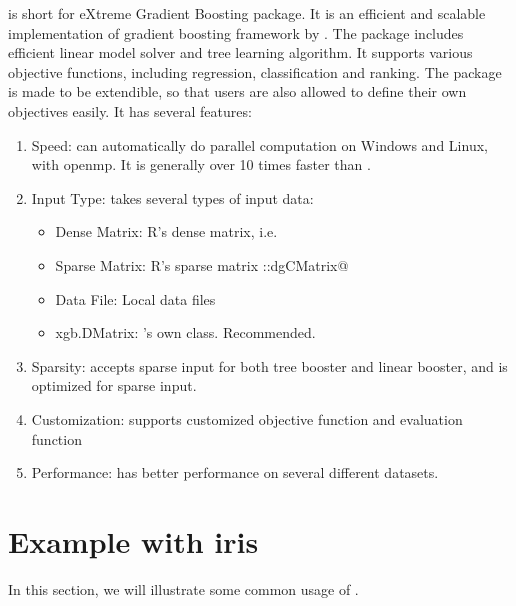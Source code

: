 \documentclass{article}\usepackage[]{graphicx}\usepackage[]{color}
\begin{document}
\verb@xgboost@ is short for eXtreme Gradient Boosting package. It is an efficient
 and scalable implementation of gradient boosting framework by \citep{friedman2001greedy}. 
The package includes efficient linear model solver and tree learning algorithm.
It supports various objective functions, including regression, classification
and ranking. The package is made to be extendible, so that users are also allowed to define their own objectives easily. It has several features:
\begin{enumerate}
    \item{Speed: }{\verb@xgboost@ can automatically do parallel computation on 
    Windows and Linux, with openmp. It is generally over 10 times faster than
    \verb@gbm@.}
    \item{Input Type: }{\verb@xgboost@ takes several types of input data:}
    \begin{itemize}
        \item{Dense Matrix: }{R's dense matrix, i.e. \verb@matrix@}
        \item{Sparse Matrix: }{R's sparse matrix \verb@Matrix::dgCMatrix@}
        \item{Data File: }{Local data files}
        \item{xgb.DMatrix: }{\verb@xgboost@'s own class. Recommended.}
    \end{itemize}
    \item{Sparsity: }{\verb@xgboost@ accepts sparse input for both tree booster 
    and linear booster, and is optimized for sparse input.}
    \item{Customization: }{\verb@xgboost@ supports customized objective function 
    and evaluation function}
    \item{Performance: }{\verb@xgboost@ has better performance on several different
    datasets.}
\end{enumerate}


\section{Example with iris}

In this section, we will illustrate some common usage of \verb@xgboost@.
\end{document}
